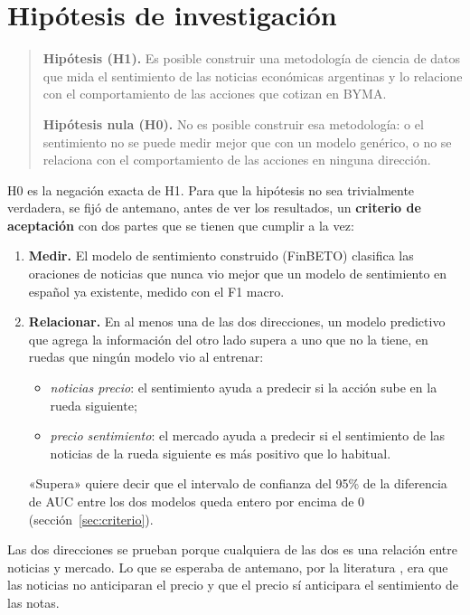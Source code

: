 \section{Hipótesis de investigación}
\label{sec:hipotesis}

\begin{quote}
\textbf{Hipótesis (H1).} Es posible construir una metodología de ciencia de datos que mida el
sentimiento de las noticias económicas argentinas y lo relacione con el comportamiento de las
acciones que cotizan en BYMA.

\textbf{Hipótesis nula (H0).} No es posible construir esa metodología: o el sentimiento no se
puede medir mejor que con un modelo genérico, o no se relaciona con el comportamiento de las
acciones en ninguna dirección.
\end{quote}

H0 es la negación exacta de H1. Para que la hipótesis no sea trivialmente verdadera, se fijó de
antemano, antes de ver los resultados, un \textbf{criterio de aceptación} con dos partes que se
tienen que cumplir a la vez:

\begin{enumerate}[label=\arabic*.]
  \item \textbf{Medir.} El modelo de sentimiento construido (FinBETO) clasifica las oraciones de
        noticias que nunca vio mejor que un modelo de sentimiento en español ya existente, medido
        con el F1 macro.
  \item \textbf{Relacionar.} En al menos una de las dos direcciones, un modelo predictivo que
        agrega la información del otro lado supera a uno que no la tiene, en ruedas que ningún
        modelo vio al entrenar:
        \begin{itemize}
          \item \textit{noticias \flecha{} precio}: el sentimiento ayuda a predecir si la acción
                sube en la rueda siguiente;
          \item \textit{precio \flecha{} sentimiento}: el mercado ayuda a predecir si el
                sentimiento de las noticias de la rueda siguiente es más positivo que lo habitual.
        \end{itemize}
        «Supera» quiere decir que el intervalo de confianza del 95\% de la diferencia de AUC entre
        los dos modelos queda entero por encima de 0 (sección~\ref{sec:criterio}).
\end{enumerate}

Las dos direcciones se prueban porque cualquiera de las dos es una relación entre noticias y
mercado. Lo que se esperaba de antemano, por la literatura \citep{tetlock2007,verma2026}, era que
las noticias no anticiparan el precio y que el precio sí anticipara el sentimiento de las notas.

